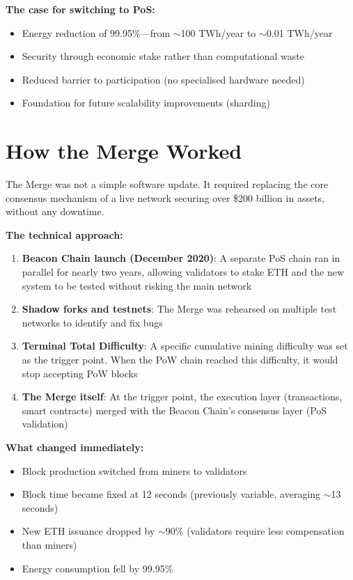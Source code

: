 \documentclass[11pt]{article}
\begin{document}
\medskip
\noindent\textbf{The case for switching to PoS:}
\begin{itemize}[leftmargin=*]
\item Energy reduction of 99.95\%---from $\sim$100 TWh/year to $\sim$0.01 TWh/year
\item Security through economic stake rather than computational waste
\item Reduced barrier to participation (no specialised hardware needed)
\item Foundation for future scalability improvements (sharding)
\end{itemize}

\section*{How the Merge Worked}

The Merge was not a simple software update. It required replacing the core consensus mechanism of a live network securing over \$200 billion in assets, without any downtime.

\medskip
\noindent\textbf{The technical approach:}
\begin{enumerate}[leftmargin=*]
\item \textbf{Beacon Chain launch (December 2020)}: A separate PoS chain ran in parallel for nearly two years, allowing validators to stake ETH and the new system to be tested without risking the main network
\item \textbf{Shadow forks and testnets}: The Merge was rehearsed on multiple test networks to identify and fix bugs
\item \textbf{Terminal Total Difficulty}: A specific cumulative mining difficulty was set as the trigger point. When the PoW chain reached this difficulty, it would stop accepting PoW blocks
\item \textbf{The Merge itself}: At the trigger point, the execution layer (transactions, smart contracts) merged with the Beacon Chain's consensus layer (PoS validation)
\end{enumerate}

\medskip
\noindent\textbf{What changed immediately:}
\begin{itemize}[leftmargin=*]
\item Block production switched from miners to validators
\item Block time became fixed at 12 seconds (previously variable, averaging $\sim$13 seconds)
\item New ETH issuance dropped by $\sim$90\% (validators require less compensation than miners)
\item Energy consumption fell by 99.95\%
\end{itemize}
\end{document}
